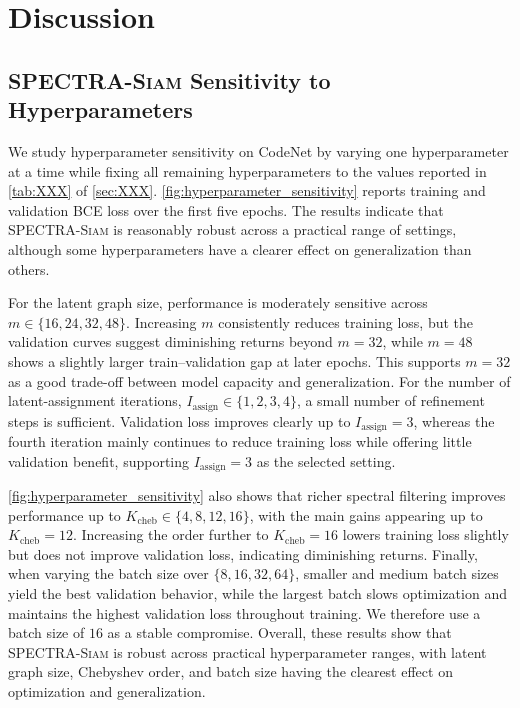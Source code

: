 \documentclass[final,5p,times,twocolumn]{elsarticle}
\newcommand{\method}{\textsc{SPECTRA-Siam}}
\theoremstyle{plain}
\begin{document}
\section{Discussion}
\label{sec:discussion}

\subsection{\method{} Sensitivity to Hyperparameters}
\label{sec:hyperparameter_sensitivity}

We study hyperparameter sensitivity on CodeNet by varying one hyperparameter at a time while fixing all remaining hyperparameters to the values reported in \autoref{tab:XXX} of \autoref{sec:XXX}. \autoref{fig:hyperparameter_sensitivity} reports training and validation BCE loss over the first five epochs. The results indicate that \method{} is reasonably robust across a practical range of settings, although some hyperparameters have a clearer effect on generalization than others.

For the latent graph size, performance is moderately sensitive across $m\in\{16,24,32,48\}$. Increasing $m$ consistently reduces training loss, but the validation curves suggest diminishing returns beyond $m=32$, while $m=48$ shows a slightly larger train--validation gap at later epochs. This supports $m=32$ as a good trade-off between model capacity and generalization. For the number of latent-assignment iterations, $I_{\mathrm{assign}}\in\{1,2,3,4\}$, a small number of refinement steps is sufficient. Validation loss improves clearly up to $I_{\mathrm{assign}}=3$, whereas the fourth iteration mainly continues to reduce training loss while offering little validation benefit, supporting $I_{\mathrm{assign}}=3$ as the selected setting.

\autoref{fig:hyperparameter_sensitivity} also shows that richer spectral filtering improves performance up to $K_{\mathrm{cheb}}\in\{4,8,12,16\}$, with the main gains appearing up to $K_{\mathrm{cheb}}=12$. Increasing the order further to $K_{\mathrm{cheb}}=16$ lowers training loss slightly but does not improve validation loss, indicating diminishing returns. Finally, when varying the batch size over $\{8,16,32,64\}$, smaller and medium batch sizes yield the best validation behavior, while the largest batch slows optimization and maintains the highest validation loss throughout training. We therefore use a batch size of $16$ as a stable compromise. Overall, these results show that \method{} is robust across practical hyperparameter ranges, with latent graph size, Chebyshev order, and batch size having the clearest effect on optimization and generalization.
\end{document}
